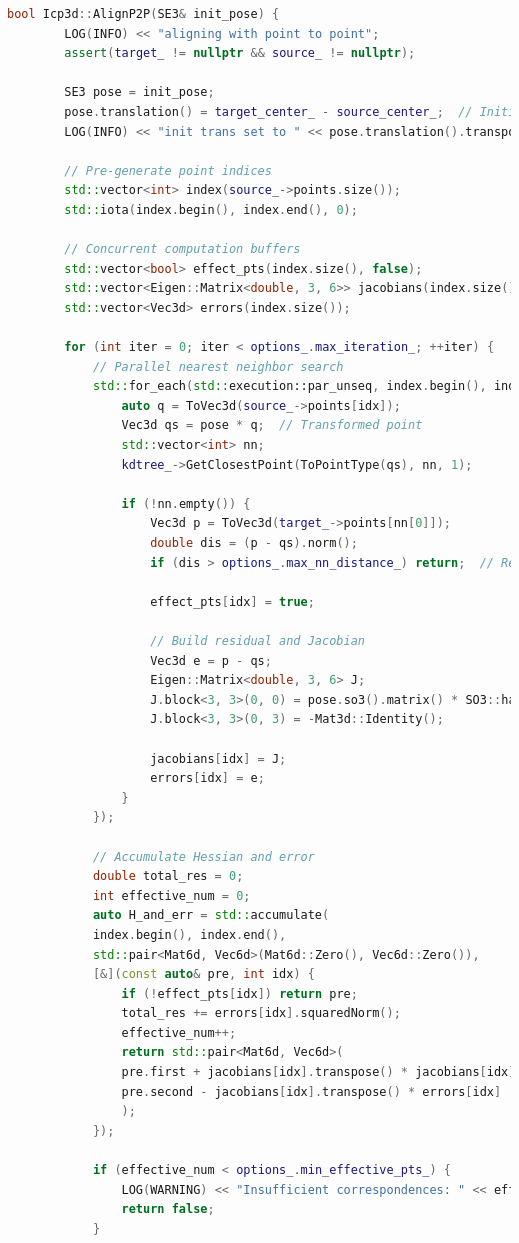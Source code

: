 \begin{lstlisting}[language=c++,caption=ch7/icp\_3d.cc]
	bool Icp3d::AlignP2P(SE3& init_pose) {
		LOG(INFO) << "aligning with point to point";
		assert(target_ != nullptr && source_ != nullptr);
		
		SE3 pose = init_pose;
		pose.translation() = target_center_ - source_center_;  // Initialize translation
		LOG(INFO) << "init trans set to " << pose.translation().transpose();
		
		// Pre-generate point indices
		std::vector<int> index(source_->points.size());
		std::iota(index.begin(), index.end(), 0);
		
		// Concurrent computation buffers
		std::vector<bool> effect_pts(index.size(), false);
		std::vector<Eigen::Matrix<double, 3, 6>> jacobians(index.size());
		std::vector<Vec3d> errors(index.size());
		
		for (int iter = 0; iter < options_.max_iteration_; ++iter) {
			// Parallel nearest neighbor search
			std::for_each(std::execution::par_unseq, index.begin(), index.end(), [&](int idx) {
				auto q = ToVec3d(source_->points[idx]);
				Vec3d qs = pose * q;  // Transformed point
				std::vector<int> nn;
				kdtree_->GetClosestPoint(ToPointType(qs), nn, 1);
				
				if (!nn.empty()) {
					Vec3d p = ToVec3d(target_->points[nn[0]]);
					double dis = (p - qs).norm();
					if (dis > options_.max_nn_distance_) return;  // Reject outliers
					
					effect_pts[idx] = true;
					
					// Build residual and Jacobian
					Vec3d e = p - qs;
					Eigen::Matrix<double, 3, 6> J;
					J.block<3, 3>(0, 0) = pose.so3().matrix() * SO3::hat(q);
					J.block<3, 3>(0, 3) = -Mat3d::Identity();
					
					jacobians[idx] = J;
					errors[idx] = e;
				}
			});
			
			// Accumulate Hessian and error
			double total_res = 0;
			int effective_num = 0;
			auto H_and_err = std::accumulate(
			index.begin(), index.end(), 
			std::pair<Mat6d, Vec6d>(Mat6d::Zero(), Vec6d::Zero()),
			[&](const auto& pre, int idx) {
				if (!effect_pts[idx]) return pre;
				total_res += errors[idx].squaredNorm();
				effective_num++;
				return std::pair<Mat6d, Vec6d>(
				pre.first + jacobians[idx].transpose() * jacobians[idx],
				pre.second - jacobians[idx].transpose() * errors[idx]
				);
			});
			
			if (effective_num < options_.min_effective_pts_) {
				LOG(WARNING) << "Insufficient correspondences: " << effective_num;
				return false;
			}
			

\end{lstlisting}
